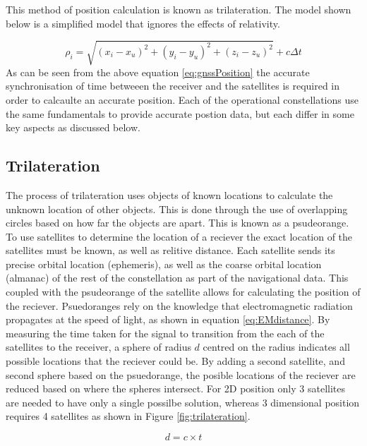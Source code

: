 This method of position calculation is known as trilateration. The model shown below is a simplified model that ignores the effects of relativity. 

\begin{equation} \label{eq:gnssPosition} 
    \rho_i = \sqrt{(x_i - x_u)^2 + (y_i - y_u)^2 + (z_i - z_u)^2} + c \Delta t
\end{equation}
As can be seen from the above equation \ref{eq:gnssPosition} the accurate synchronisation of time betweeen the receiver and the satellites is required in order to
calcaulte an accurate position. 
Each of the operational constellations use the same fundamentals to provide accurate postion data, but each differ in some key aspects as discussed below.

\subsection{Trilateration} \label{subsec:Trilateration}
The process of trilateration uses objects of known locations to calculate the unknown location of other objects. This is done through the use of overlapping circles based
on how far the objects are apart. This is known as a psudeorange. To use satellites to determine the location of a reciever the exact location of the satellites must be
known, as well as relitive distance. Each satellite sends its precise orbital location (ephemeris), as well as the coarse orbital location (almanac) of the rest of the
constellation as part of the navigational data. This coupled with the psudeorange of the satellite allows for calculating the position of the reciever. Psuedoranges rely
on the knowledge that electromagnetic radiation propagates at the speed of light, as shown in equation \ref{eq:EMdistance}. By measuring the time taken for the signal to
transition from the each of the satellites to the receiver, a sphere of radius $d$ centred on the radius indicates all possible locations that the reciever could be. By
adding a second satellite, and second sphere based on the psuedorange, the posible locations of the reciever are reduced based on where the spheres intersect. For 2D
position only 3 satellites are needed to have only a single possilbe solution, whereas 3 dimensional position requires 4 satellites as shown in Figure
\ref{fig:trilateration}.

\begin{equation} \label{eq:EMdistance}
    d = c \times t
\end{equation}

